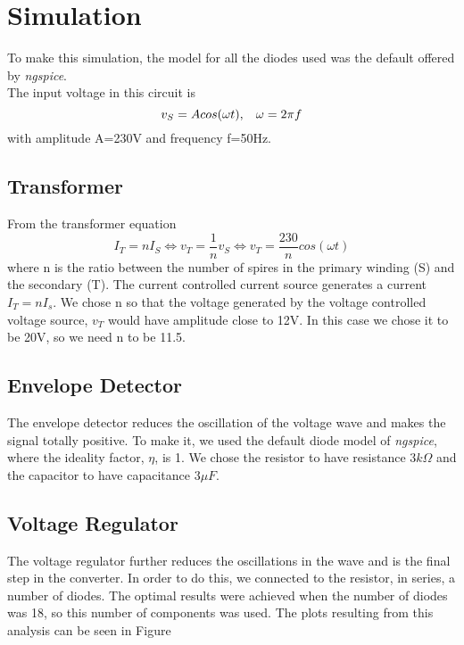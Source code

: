 \section{Simulation}
\label{sec:sim}
To make this simulation, the model for all the diodes used was the default offered by \textit{ngspice}. \\
The input voltage in this circuit is 
\begin{equation}\label{eq: vs}
v_S=Acos(\omega t),\hspace{3mm} \omega=2\pi f
\end{equation}
with amplitude A=230V and frequency f=50Hz.
\subsection{Transformer}
From the transformer equation 
\begin{equation}
  I_T=nI_S\Leftrightarrow v_T=\frac{1}{n}v_S \Leftrightarrow v_T=\frac{230}{n}cos(\omega t)
\end{equation}
where n is the ratio between the number of spires in the primary winding (S) and the secondary (T).
The current controlled current source generates a current $I_T=nI_s$. We chose n so that the voltage generated by the voltage controlled voltage source, $v_T$ would have amplitude close to 12V. In this case we chose it to be 20V, so we need n to be 11.5.\\
\subsection{Envelope Detector}
The envelope detector reduces the oscillation of the voltage wave and makes the signal totally positive.  To make it, we used the default diode model of \textit{ngspice}, where the ideality factor, $\eta$, is 1. We chose the resistor to have resistance $3k\Omega$ and the capacitor to have capacitance $3\mu F$.\\
\subsection{Voltage Regulator}
The voltage regulator further reduces the oscillations in the wave and is the final step in the converter. In order to do this, we connected to the resistor, in series, a number of diodes. The optimal results were achieved when the number of diodes was 18, so this number of components was used. 
The plots resulting from this analysis can be seen in Figure